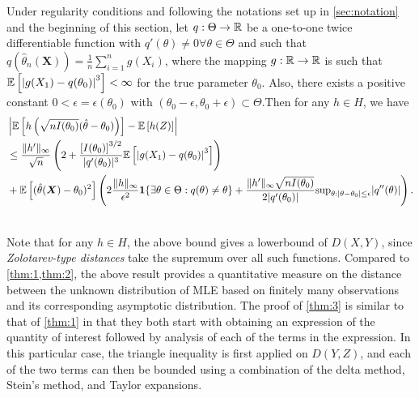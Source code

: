 \begin{theorem}\label{thm:3}
Under regularity conditions and following the notations set up in \cref{sec:notation} and the beginning of this section, let $q:\Theta \rightarrow \mathbb{R}$ be a one-to-one twice differentiable function with $q'(\theta) \neq 0 \forall \theta\in\Theta$ and such that $q\left( \hat{\theta}_n(\bm{X})\right) = \frac{1}{n}\sum_{i=1}^n g(X_i)$, where the mapping $g:\mathbb{R}\rightarrow\mathbb{R}$ is such that $\mathbb{E}\left[ \left| g(X_1)-q(\theta_0) \right|^3 \right] < \infty$ for the true parameter $\theta_0$. Also, there exists a positive constant $0 < \epsilon = \epsilon(\theta_0)$ with $(\theta_0 - \epsilon, \theta_0 + \epsilon) \subset \Theta$.Then for any $h\in H$, we have
\begin{align*}
&\left| \mathbb{E}\left[ h\left(\sqrt{nI(\theta_0)}(\hat{\theta} - \theta_0)\right) \right] - \mathbb{E}\left[h(Z)\right] \right|\\
&\leq \frac{\|h'\|_\infty}{\sqrt{n}}\left(2 + \frac{\left[I(\theta_0)\right]^{3/2}}{|q'(\theta_0)|^3} \mathbb{E}\left[\left|g(X_1) - q(\theta_0)\right|^3\right] \right) \\
&+\mathbb{E}\left[(\hat{\theta}(\bm{X})-\theta_0)^2\right]\left( 2\frac{\|h\|_\infty}{\epsilon^2}\mathbf{1}\{\exists\theta\in\Theta:q(\theta)\neq\theta\}+\frac{\|h'\|_\infty\sqrt{nI(\theta_0)}}{2|q'(\theta_0)|}\text{sup}_{\theta:|\theta-\theta_0|\leq\epsilon}|q''(\theta)| \right).
\end{align*}
\end{theorem}$ $\\
Note that for any $h\in H$, the above bound gives a lowerbound of $D(X,Y)$, since \emph{Zolotarev-type distances} take the supremum over all such functions. Compared to \cref{thm:1,thm:2}, the above result provides a quantitative measure on the distance between the unknown distribution of MLE based on finitely many observations and its corresponding asymptotic distribution. The proof of \cref{thm:3} is similar to that of \cref{thm:1} in that they both start with obtaining an expression of the quantity of interest followed by analysis of each of the terms in the expression. In this particular case, the triangle inequality is first applied on $D(Y,Z)$, and each of the two terms can then be bounded using a combination of the delta method, Stein's method, and Taylor expansions.\\\\
